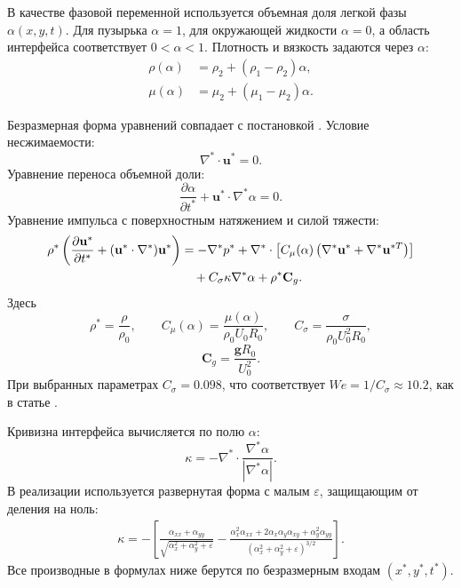 \documentclass[12pt,a4paper]{article}
\newcommand{\Rbase}{R_0}
\newcommand{\Uref}{U_0}
\newcommand{\rhoref}{\rho_0}
\begin{document}
В качестве фазовой переменной используется объемная доля легкой фазы
\(\alpha(x,y,t)\). Для пузырька \(\alpha=1\), для окружающей жидкости
\(\alpha=0\), а область интерфейса соответствует \(0<\alpha<1\).
Плотность и вязкость задаются через \(\alpha\):
\begin{align}
    \rho(\alpha) &= \rho_2 + (\rho_1-\rho_2)\alpha, \\
    \mu(\alpha) &= \mu_2 + (\mu_1-\mu_2)\alpha.
\end{align}

Безразмерная форма уравнений совпадает с постановкой \cite{Buhendwa2021}.
Условие несжимаемости:
\begin{equation}
    \nabla^*\cdot\mathbf{u}^*=0.
    \label{eq:mass}
\end{equation}
Уравнение переноса объемной доли:
\begin{equation}
    \frac{\partial\alpha}{\partial t^*}
    + \mathbf{u}^*\cdot\nabla^*\alpha=0.
    \label{eq:alpha_transport}
\end{equation}
Уравнение импульса с поверхностным натяжением и силой тяжести:
\begin{align}
    \rho^*
    \left(
        \frac{\partial\mathbf{u}^*}{\partial t^*}
        +(\mathbf{u}^*\cdot\nabla^*)\mathbf{u}^*
    \right)
    &=
    -\nabla^*p^*
    +\nabla^*\cdot
    \left[
        C_\mu(\alpha)
        \left(\nabla^*\mathbf{u}^*+\nabla^*\mathbf{u}^{*T}\right)
    \right]
    \notag\\
    &\quad
    + C_\sigma \kappa\nabla^*\alpha
    + \rho^*\mathbf{C}_g.
    \label{eq:momentum}
\end{align}
Здесь
\[
    \rho^*=\frac{\rho}{\rhoref},
    \qquad
    C_\mu(\alpha)=\frac{\mu(\alpha)}{\rhoref\Uref\Rbase},
    \qquad
    C_\sigma=\frac{\sigma}{\rhoref\Uref^2\Rbase},
\]
\[
    \mathbf{C}_g=\frac{\mathbf{g}\Rbase}{\Uref^2}.
\]
При выбранных параметрах \(C_\sigma=0.098\), что соответствует
\(We=1/C_\sigma\approx 10.2\), как в статье \cite{Buhendwa2021}.

Кривизна интерфейса вычисляется по полю \(\alpha\):
\begin{equation}
    \kappa
    =
    -\nabla^*\cdot
    \frac{\nabla^*\alpha}{|\nabla^*\alpha|}.
    \label{eq:curvature_vector}
\end{equation}
В реализации используется развернутая форма с малым \(\varepsilon\), защищающим
от деления на ноль:
\begin{align}
    \kappa
    =
    -\left[
    \frac{\alpha_{xx}+\alpha_{yy}}{\sqrt{\alpha_x^2+\alpha_y^2+\varepsilon}}
    -
    \frac{
        \alpha_x^2\alpha_{xx}
        +2\alpha_x\alpha_y\alpha_{xy}
        +\alpha_y^2\alpha_{yy}
    }{
        \left(\alpha_x^2+\alpha_y^2+\varepsilon\right)^{3/2}
    }
    \right].
    \label{eq:curvature_expanded}
\end{align}
Все производные в формулах ниже берутся по безразмерным входам
\((x^*,y^*,t^*)\).
\end{document}
